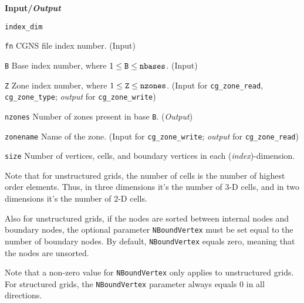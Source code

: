 \noindent
\textbf{\textcolor{input}{Input}/\textcolor{output}{\textit{Output}}}

\begin{Ventryi}{\texttt{index\_dim}}\raggedright
\item [\texttt{fn}]
      CGNS file index number.
      (\textcolor{input}{Input})
\item [\texttt{B}]
      Base index number, where $1 \leq \text{\texttt{B}} \leq \text{\texttt{nbases}}$.
      (\textcolor{input}{Input})
\item [\texttt{Z}]
      Zone index number, where $1 \leq \text{\texttt{Z}} \leq \text{\texttt{nzones}}$.
      (\textcolor{input}{Input} for \texttt{cg\_zone\_read},
      \texttt{cg\_zone\_type}; \textcolor{output}{\textit{output}} for
      \texttt{cg\_zone\_write})
\item [\texttt{nzones}]
      Number of zones present in base \texttt{B}.
      (\textcolor{output}{\textit{Output}})
\item [\texttt{zonename}]
      Name of the zone.
      (\textcolor{input}{Input} for \texttt{cg\_zone\_write};
      \textcolor{output}{\textit{output}} for \texttt{cg\_zone\_read})
\item [\texttt{size}]
      Number of vertices, cells, and boundary vertices in each
      (\textit{index})-dimension.

      Note that for unstructured grids, the number of cells is the
      number of highest order elements.
      Thus, in three dimensions it's the number of 3-D cells, and in
      two dimensions it's the number of 2-D cells.

      Also for unstructured grids, if the nodes are sorted between
      internal nodes and boundary nodes, the optional parameter
      \texttt{NBoundVertex} must be set equal to the number of boundary
      nodes.
      By default, \texttt{NBoundVertex} equals zero, meaning that the
      nodes are unsorted.

      Note that a non-zero value for \texttt{NBoundVertex} only applies
      to unstructured grids.
      For structured grids, the \texttt{NBoundVertex} parameter always
      equals 0 in all directions.


\end{Ventryi}
